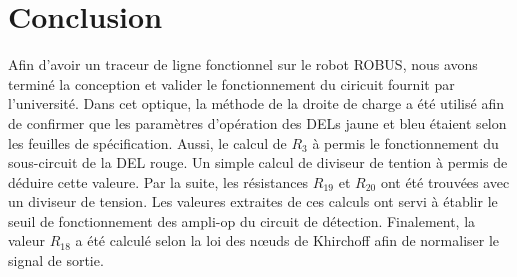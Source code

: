 \documentclass[a11paper, 11pt]{article}
\begin{document}
\section{Conclusion}

Afin d'avoir un traceur de ligne fonctionnel sur le robot ROBUS, nous avons
terminé la conception et valider le fonctionnement du ciricuit fournit
par l'université.
Dans cet optique, la méthode de la droite de charge a été utilisé afin
de confirmer que les paramètres d'opération des DELs jaune et bleu étaient
selon les feuilles de spécification.
Aussi, le calcul de $R_3$ à permis le fonctionnement du sous-circuit de la DEL rouge.
Un simple calcul de diviseur de tention à permis de déduire cette valeure.
Par la suite, les résistances $R_{19}$ et $R_{20}$ ont été trouvées avec un diviseur de tension.
Les valeures extraites de ces calculs ont servi à établir le seuil de
fonctionnement des ampli-op du circuit de détection.
Finalement, la valeur $R_{18}$ a été calculé selon la loi des n\oe uds de Khirchoff
afin de normaliser le signal de sortie.


%
%
%
%

\newpage
\printbibliography
\end{document}
